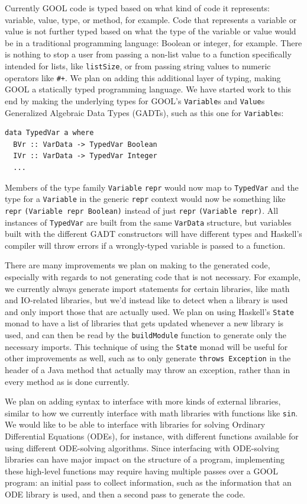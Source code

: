 \documentclass[sigplan,review,anonymous,prologue,dvipsnames]{acmart}
\begin{document}
Currently GOOL code is typed based on what kind of code it represents:
variable, value, type, or method, for example. Code that represents a variable
or value is not further typed based on what the type of the variable or value
would be in a traditional programming language: Boolean or integer, for
example. There is nothing to stop a user from passing a non-list value to a
function specifically intended for lists, like \verb|listSize|, or from passing
string values to numeric operators like \verb|#+|. We plan on adding this
additional layer of typing, making GOOL a statically typed programming
language. We have started work to this end by making the underlying types for
GOOL's \verb|Variable|s and \verb|Value|s Generalized Algebraic Data Types
(GADTs), such as this one for \verb|Variable|s:
\begin{lstlisting}
data TypedVar a where
  BVr :: VarData -> TypedVar Boolean
  IVr :: VarData -> TypedVar Integer
  ...
\end{lstlisting}
Members of the type family \verb|Variable| \verb|repr| would now map to
\verb|TypedVar| and the type for a \verb|Variable| in the generic \verb|repr|
context would now be something like \verb|repr| \verb|(Variable repr Boolean)|
instead of just \verb|repr| \verb|(Variable repr)|. All instances of
\verb|TypedVar| are built from the same \verb|VarData| structure, but variables
built with the different GADT constructors will have different types and
Haskell's compiler will throw errors if a wrongly-typed variable is passed to a
function.

There are many improvements we plan on making to the generated code, especially
with regards to not generating code that is not necessary. For example, we
currently always generate import statements for certain libraries, like math
and IO-related libraries, but we'd instead like to detect when a library is
used and only import those that are actually used. We plan on using Haskell's
\verb|State| monad to have a list of libraries that gets updated whenever a new
library is used, and can then be read by the \verb|buildModule| function to
generate only the necessary imports. This technique of using the \verb|State|
monad will be useful for other improvements as well, such as to only generate
\verb|throws Exception| in the header of a Java method that actually may throw
an exception, rather than in every method as is done currently.

We plan on adding syntax to interface with more kinds of external libraries,
similar to how we currently interface with math libraries with functions like
\verb|sin|. We would like to be able to interface with libraries for solving
Ordinary Differential Equations (ODEs), for instance, with different functions
available for using different ODE-solving algorithms. Since interfacing with
ODE-solving libraries can have major impact on the structure of a program,
implementing these high-level functions may require having multiple passes over
a GOOL program: an initial pass to collect information, such as the information
that an ODE library is used, and then a second pass to generate the code.
\end{document}
